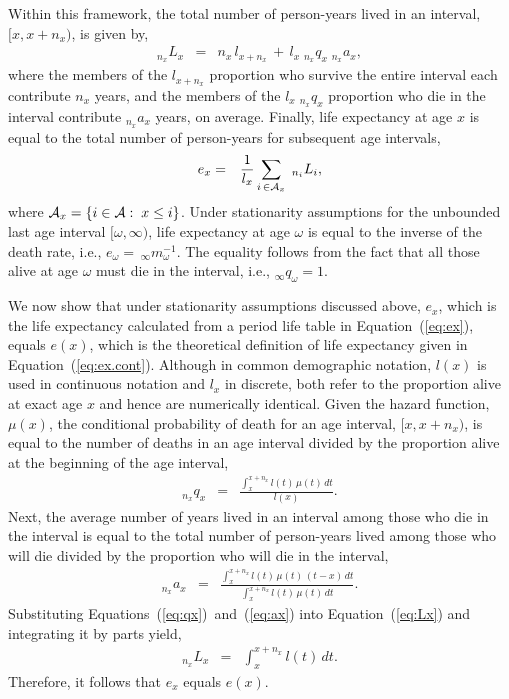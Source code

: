 \documentclass[11pt,letterpaper]{article}
\theoremstyle{plain}
\begin{document}
Within this framework, the total number of person-years lived in an
interval, $[x, x+n_x)$, is given by,
\begin{eqnarray}
  _{n_x}L_x & = & n_x\,l_{x+n_x}\,+\,l_x\;_{n_x}q_x\;_{n_x}a_x,\label{eq:Lx}
\end{eqnarray}
where the members of the $l_{x+n_x}$ proportion who survive the entire
interval each contribute $n_x$ years, and the members of the
$l_x\;_{n_x}q_x$ proportion who die in the interval contribute
$_{n_x}a_x$ years, on average.  Finally, life expectancy at age $x$ is
equal to the total number of person-years for subsequent age
intervals,
\begin{eqnarray}
  e_x & = & \frac{1}{l_x} \sum_{i\, \in \mathcal{A}_x}\; _{n_i}L_{i}, \label{eq:ex}
\end{eqnarray}
where $\mathcal{A}_x = \{i \in \mathcal{A}: \; x \le i\}$.  Under stationarity
assumptions for the unbounded last age interval $[\omega,\infty)$,
life expectancy at age $\omega$ is equal to the inverse of the death
rate, i.e., $e_\omega=\,_\infty m_\omega^{-1}$.  The equality follows
from the fact that all those alive at age $\omega$ must die in the
interval, i.e., $_\infty q_\omega=1$.

We now show that under stationarity assumptions discussed above,
$e_x$, which is the life expectancy calculated from a period life
table in Equation~(\ref{eq:ex}), equals $e(x)$, which is the
theoretical definition of life expectancy given in
Equation~(\ref{eq:ex.cont}).  Although in common demographic notation,
$l(x)$ is used in continuous notation and $l_x$ in discrete, both
refer to the proportion alive at exact age $x$ and hence are
numerically identical.  Given the hazard function, $\mu(x)$, the
conditional probability of death for an age interval, $[x,x+n_x)$, is
equal to the number of deaths in an age interval divided by the
proportion alive at the beginning of the age interval,
\begin{eqnarray}
  _{n_x}q_x & = & \frac{\int_x^{x+n_x} l(t)\,\mu(t)\,dt}{l(x)}. \label{eq:qx}
\end{eqnarray}
Next, the average number of years lived in an interval among those who
die in the interval is equal to the total number of person-years lived
among those who will die divided by the proportion who will die in the
interval,
\begin{eqnarray}
  _{n_x}a_x & = & \frac{\int_x^{x+n_x} l(t)\,\mu(t)\,(t-x)\,dt}
  {\int_x^{x+n_x}l(t)\,\mu(t)\,dt}. \label{eq:ax}
\end{eqnarray}
Substituting Equations~(\ref{eq:qx})~and~(\ref{eq:ax}) into
Equation~(\ref{eq:Lx}) and integrating it by parts yield,
\begin{eqnarray}
  _{n_x}L_x & = & \int_x^{x+n_x} l(t)\,dt. \label{eq:Lx_integral}
\end{eqnarray}  
Therefore, it follows that $e_x$ equals $e(x)$.
\end{document}
